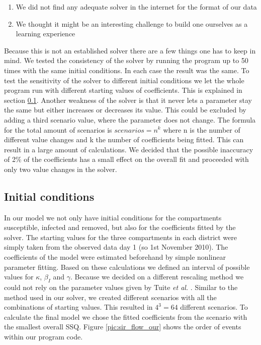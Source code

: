 \documentclass[11pt]{article}
\begin{document}
\begin{enumerate}
\item We did not find any adequate solver in the internet for the format of our data
\item We thought it might be an interesting challenge to build one ourselves as a learning experience
\end{enumerate}

Because this is not an established solver there are a few things one has to keep in mind. We tested the consistency of the solver by running the program up to 50 times with the same initial conditions. In each case the result was the same. To test the sensitivity of the solver to different initial conditions we let the whole program run with different starting values of coefficients. This is explained in section \ref{sec:initial conditions}. Another weakness of the solver is that it never lets a parameter stay the same but either increases or decreases its value. This could be excluded by adding a third scenario value, where the parameter does not change. The formula for the total amount of scenarios is $scenarios=n^{k}$ where n is the number of different value changes and k the number of coefficients being fitted. This can result in a large amount of calculations. We decided that the possible inaccuracy of 2\% of the coefficients has a small effect on the overall fit and proceeded with only two value changes in the solver.



\subsection{Initial conditions}
\label{sec:initial conditions}
In our model we not only have initial conditions for the compartments susceptible, infected and removed, but also for the coefficients fitted by the solver. The starting values for the three compartments in each district were simply taken from the observed data day 1 (so 1st November 2010). The coefficients of the model were estimated beforehand by simple nonlinear parameter fitting. Based on these calculations we defined an interval of possible values for $\kappa$, $\beta_{I}$ and $\gamma$. Because we decided on a different rescaling method we could not rely on the parameter values given by Tuite \textit{et al.} \cite{tuite:2011}. Similar to the method used in our solver, we created different scenarios with all the combinations of starting values. This resulted in $4^{3}=64$ different scenarios. To calculate the final model we chose the fitted coefficients from the scenario with the smallest overall SSQ. Figure \ref{pic:sir_flow_our} shows the order of events within our program code.
\end{document}
